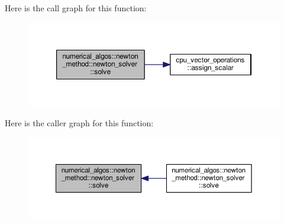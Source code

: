 Here is the call graph for this function\-:\nopagebreak
\begin{figure}[H]
\begin{center}
\leavevmode
\includegraphics[width=350pt]{classnumerical__algos_1_1newton__method_1_1newton__solver_ac7b04b8ab16d9ee3e001c8c6c81cf55c_cgraph}
\end{center}
\end{figure}




Here is the caller graph for this function\-:\nopagebreak
\begin{figure}[H]
\begin{center}
\leavevmode
\includegraphics[width=350pt]{classnumerical__algos_1_1newton__method_1_1newton__solver_ac7b04b8ab16d9ee3e001c8c6c81cf55c_icgraph}
\end{center}
\end{figure}


